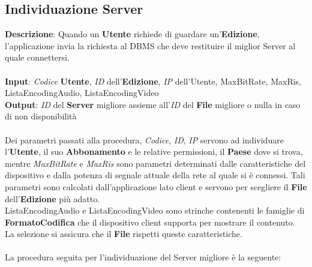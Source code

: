 \documentclass{article}
\begin{document}
\subsection{Individuazione Server}
\textbf{Descrizione}: Quando un \textbf{Utente} richiede di guardare un'\textbf{Edizione}, l'applicazione invia la richiesta al DBMS che deve restituire il miglior Server al quale connettersi. \\ \\
\textbf{Input}: \textit{Codice} \textbf{Utente}, \textit{ID} dell'\textbf{Edizione}, \textit{IP} dell'Utente, MaxBitRate, MaxRis, ListaEncodingAudio, ListaEncodingVideo \\
\textbf{Output}: \textit{ID} del \textbf{Server} migliore assieme all'\textit{ID} del \textbf{File} migliore o nulla in caso di non disponibilità \\ \\
Dei parametri passati alla procedura, \textit{Codice}, \textit{ID}, \textit{IP} servono ad individuare l'\textbf{Utente}, il suo \textbf{Abbonamento} e le relative permissioni, il \textbf{Paese} dove si trova, mentre \textit{MaxBitRate} e \textit{MaxRis} sono parametri determinati dalle caratteristiche del dispositivo e dalla potenza di segnale attuale della rete al quale si è connessi. Tali parametri sono calcolati dall'applicazione lato client e servono per scegliere il \textbf{File} dell'\textbf{Edizione} più adatto. \\ 
ListaEncodingAudio e ListaEncodingVideo sono strinche contenenti le famiglie di \textbf{FormatoCodifica} che il dispositivo client supporta per mostrare il contenuto. La selezione si assicura che il \textbf{File} rispetti queste caratteristiche. \\ \\
La procedura seguita per l'individuazione del Server migliore è la seguente: \\ \\
\end{document}
